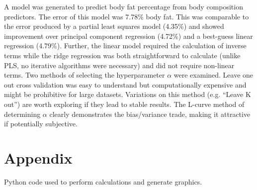 \documentclass{IEEEtran}
\begin{document}
A model was generated to predict body fat percentage from body composition predictors. The error of this model was \num{7.78}\% body fat. This was comparable to the error produced by a partial least squares model (\num{4.35}\%) and showed improvement over principal component regression (\num{4.72}\%) and a best-guess linear regression (\num{4.79}\%). Further, the linear model required the calculation of inverse terms while the ridge regression was both straightforward to calculate (unlike PLS, no iterative algorithms were necessary) and did not require non-linear terms. Two methods of selecting the hyperparameter $\alpha$ were examined. Leave one out cross validation was easy to understand but computationally expensive and might be prohibitive for large datasets. Variations on this method (e.g. ``Leave K out'') are worth exploring if they lead to stable results. The L-curve method of determining $\alpha$ clearly demonstrates the bias/variance trade, making it attractive if potentially subjective. 

\printbibliography

\onecolumn
\section{Appendix}
Python code used to perform calculations and generate graphics.
\lstset{frame=single}

\end{document}
